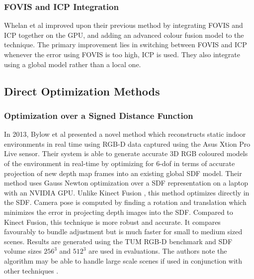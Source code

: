 \subsubsection{FOVIS and ICP Integration}

Whelan et al improved \cite{Whelan13Robust} upon their previous method \cite{Whelan12Kintinous} by integrating FOVIS and ICP together on the GPU, and adding an advanced colour fusion model to the technique. The primary improvement lies in switching between FOVIS and ICP whenever the error using FOVIS is too high, ICP is used. They also integrate using a global model rather than a local one. \\


\subsection{Direct Optimization Methods}

\subsubsection{Optimization over a Signed Distance Function}

In 2013, Bylow et al \cite{Bylow13Real} presented a novel method which reconstructs static indoor environments in real time using RGB-D data captured using the Asus Xtion Pro Live sensor. Their system is able to generate accurate 3D RGB coloured models of the environment in real-time by optimizing for 6-dof in terms of accurate projection of new depth map frames into an existing global SDF model. Their method uses Gauss Newton optimization over a SDF representation on a laptop with an NVIDIA GPU. Unlike Kinect Fusion \cite{Newcombe11Kinectfusion}, this method optimizes directly in the SDF. Camera pose is computed by finding a rotation and translation which minimizes the error in projecting depth images into the SDF. Compared to Kinect Fusion, this technique is more robust and accurate. It compares favourably to bundle adjustment but is much faster for small to medium sized scenes. Results are generated using the TUM RGB-D benchmark and SDF volume sizes $256^3$ and $512^3$ are used in evaluations. The authors note the algorithm may be able to handle large scale scenes if used in conjunction with other techniques \cite{Kaess11Isam2,Kummerle11G}. \\

